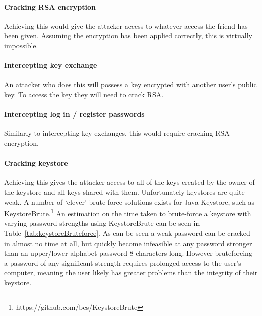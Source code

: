 \documentclass[12pt, titlepage]{article}
\begin{document}
\paragraph*{Cracking RSA encryption} Achieving this would give the attacker access to whatever access the friend has been given. Assuming the encryption has been applied correctly, this is virtually impossible.

\paragraph*{Intercepting key exchange} An attacker who does this will possess a key encrypted with another user's public key. To access the key they will need to crack RSA.

\paragraph*{Intercepting log in / register passwords} Similarly to intercepting key exchanges, this would require cracking RSA encryption.

\paragraph*{Cracking keystore} Achieving this gives the attacker access to all of the keys created by the owner of the keystore and all keys shared with them. Unfortunately keystores are quite weak. A number of `clever' brute-force solutions exists for Java Keystore, such as KeystoreBrute.\footnote{https://github.com/bes/KeystoreBrute} An estimation on the time taken to brute-force a keystore with varying password strengths using KeystoreBrute can be seen in Table~\ref{tab:keystoreBruteforce}. As can be seen a weak password can be cracked in almost no time at all, but quickly become infeasible at any password stronger than an upper/lower alphabet password 8 characters long. However bruteforcing a password of any significant strength requires prolonged access to the user's computer, meaning the user likely has greater problems than the integrity of their keystore.
\end{document}
